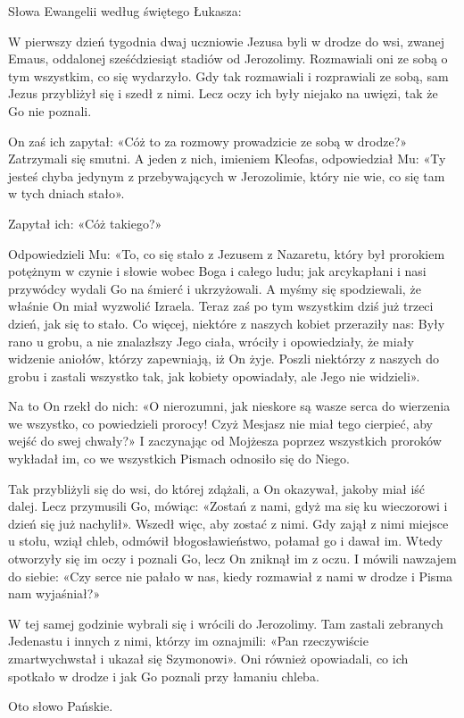 \indent{} Słowa Ewangelii według świętego Łukasza:

W pierwszy dzień tygodnia dwaj uczniowie Jezusa byli w drodze do wsi, zwanej Emaus, oddalonej sześćdziesiąt stadiów od Jerozolimy. Rozmawiali oni ze sobą o tym wszystkim, co się wydarzyło. Gdy tak rozmawiali i rozprawiali ze sobą, sam Jezus przybliżył się i szedł z nimi. Lecz oczy ich były niejako na uwięzi, tak że Go nie poznali.

On zaś ich zapytał: «Cóż to za rozmowy prowadzicie ze sobą w drodze?» Zatrzymali się smutni. A jeden z nich, imieniem Kleofas, odpowiedział Mu: «Ty jesteś chyba jedynym z przebywających w Jerozolimie, który nie wie, co się tam w tych dniach stało».

Zapytał ich: «Cóż takiego?»

Odpowiedzieli Mu: «To, co się stało z Jezusem z Nazaretu, który był prorokiem potężnym w czynie i słowie wobec Boga i całego ludu; jak arcykapłani i nasi przywódcy wydali Go na śmierć i ukrzyżowali. A myśmy się spodziewali, że właśnie On miał wyzwolić Izraela. Teraz zaś po tym wszystkim dziś już trzeci dzień, jak się to stało. Co więcej, niektóre z naszych kobiet przeraziły nas: Były rano u grobu, a nie znalazłszy Jego ciała, wróciły i opowiedziały, że miały widzenie aniołów, którzy zapewniają, iż On żyje. Poszli niektórzy z naszych do grobu i zastali wszystko tak, jak kobiety opowiadały, ale Jego nie widzieli».

Na to On rzekł do nich: «O nierozumni, jak nieskore są wasze serca do wierzenia we wszystko, co powiedzieli prorocy! Czyż Mesjasz nie miał tego cierpieć, aby wejść do swej chwały?» I zaczynając od Mojżesza poprzez wszystkich proroków wykładał im, co we wszystkich Pismach odnosiło się do Niego.

Tak przybliżyli się do wsi, do której zdążali, a On okazywał, jakoby miał iść dalej. Lecz przymusili Go, mówiąc: «Zostań z nami, gdyż ma się ku wieczorowi i dzień się już nachylił». Wszedł więc, aby zostać z nimi. Gdy zajął z nimi miejsce u stołu, wziął chleb, odmówił błogosławieństwo, połamał go i dawał im. Wtedy otworzyły się im oczy i poznali Go, lecz On zniknął im z oczu. I mówili nawzajem do siebie: «Czy serce nie pałało w nas, kiedy rozmawiał z nami w drodze i Pisma nam wyjaśniał?»

W tej samej godzinie wybrali się i wrócili do Jerozolimy. Tam zastali zebranych Jedenastu i innych z nimi, którzy im oznajmili: «Pan rzeczywiście zmartwychwstał i ukazał się Szymonowi». Oni również opowiadali, co ich spotkało w drodze i jak Go poznali przy łamaniu chleba.

Oto słowo Pańskie.